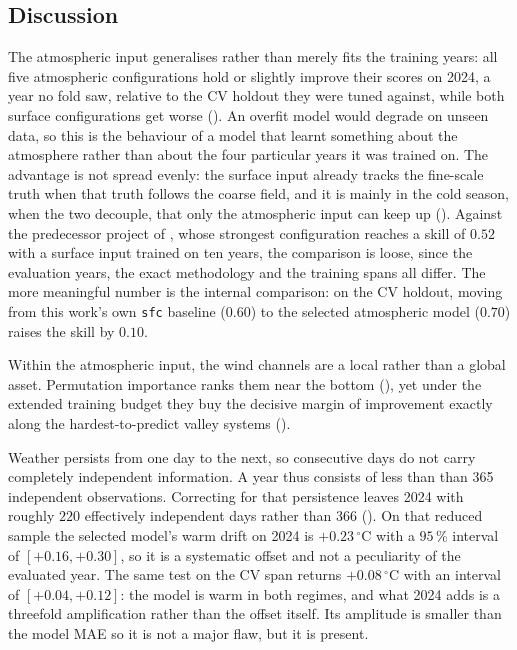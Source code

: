 \subsection{Discussion}\label{subsec:single-tmax-discussion}



The atmospheric input generalises rather than merely fits the training years: all five atmospheric configurations hold or slightly improve their scores on 2024, a year no fold saw, relative to the CV holdout they were tuned against, while both surface configurations get worse (). An overfit model would degrade on unseen data, so this is the behaviour of a model that learnt something about the atmosphere rather than about the four particular years it was trained on. The advantage is not spread evenly: the surface input already tracks the fine-scale truth when that truth follows the coarse field, and it is mainly in the cold season, when the two decouple, that only the atmospheric input can keep up (). Against the predecessor project of \textcite{passos}, whose strongest configuration reaches a skill of $0.52$ with a surface input trained on ten years, the comparison is loose, since the evaluation years, the exact methodology and the training spans all differ. The more meaningful number is the internal comparison: on the CV holdout, moving from this work's own \texttt{sfc} baseline ($0.60$) to the selected atmospheric model ($0.70$) raises the skill by $0.10$.



Within the atmospheric input, the wind channels are a local rather than a global asset. Permutation importance ranks them near the bottom (), yet under the extended training budget they buy the decisive margin of improvement exactly along the hardest-to-predict valley systems (). 

Weather persists from one day to the next, so consecutive days do not carry completely independent information. A year thus consists of less than than 365 independent observations. Correcting for that persistence leaves 2024 with roughly $220$ effectively independent days rather than $366$ (). On that reduced sample the selected model's warm drift on 2024 is $+0.23\,^{\circ}\mathrm{C}$ with a $95\,\%$ interval of $[+0.16, +0.30]$, so it is a systematic offset and not a peculiarity of the evaluated year. The same test on the CV span returns $+0.08\,^{\circ}\mathrm{C}$ with an interval of $[+0.04, +0.12]$: the model is warm in both regimes, and what 2024 adds is a threefold amplification rather than the offset itself. Its amplitude is smaller than the model MAE so it is not a major flaw, but it is present.

